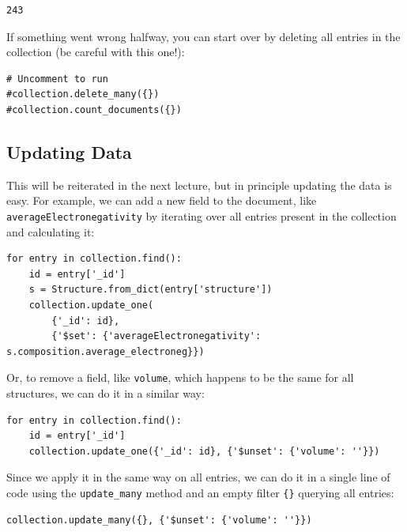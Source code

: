 \begin{verbatim}
243
\end{verbatim}

If something went wrong halfway, you can start over by deleting all
entries in the collection (be careful with this one!):

\begin{verbatim}
# Uncomment to run
#collection.delete_many({})
#collection.count_documents({})
\end{verbatim}

\hypertarget{updating-data}{%
\subsection{Updating Data}\label{pysipfenntutorial:updating-data}}

This will be reiterated in the next lecture, but in principle updating
the data is easy. For example, we can add a new field to the document,
like \texttt{averageElectronegativity} by iterating
over all entries present in the collection and calculating it:

\begin{verbatim}
for entry in collection.find():
    id = entry['_id']
    s = Structure.from_dict(entry['structure'])
    collection.update_one(
        {'_id': id}, 
        {'$set': {'averageElectronegativity': s.composition.average_electroneg}})
\end{verbatim}

Or, to remove a field, like \texttt{volume}, which
happens to be the same for all structures, we can do it in a similar
way:

\begin{verbatim}
for entry in collection.find():
    id = entry['_id']
    collection.update_one({'_id': id}, {'$unset': {'volume': ''}})
\end{verbatim}

Since we apply it in the same way on all entries, we can do it in a
single line of code using the \texttt{update\_many}
method and an empty filter \texttt{\{\}} querying all
entries:

\begin{verbatim}
collection.update_many({}, {'$unset': {'volume': ''}})
\end{verbatim}


